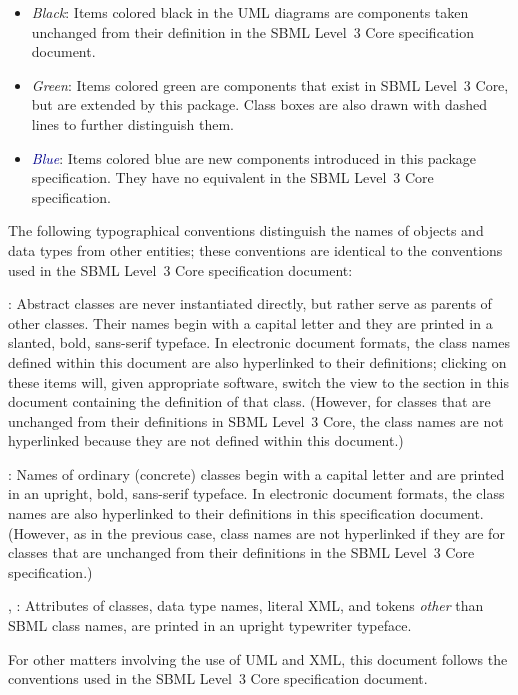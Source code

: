 \begin{itemize}

\item[\raisebox{2.75pt}{\colorbox{black}{\rule{0.8pt}{0.8pt}}}]
  \emph{Black}: Items colored black in the UML diagrams are components
  taken unchanged from their definition in the SBML Level~3 Core
  specification document.

\item[\raisebox{2.75pt}{\colorbox{mediumgreen}{\rule{0.8pt}{0.8pt}}}]
  \emph{\textcolor{mediumgreen}{Green}}: Items colored green are
  components that exist in SBML Level~3 Core, but are extended by this
  package.  Class boxes are also drawn with dashed lines to further
  distinguish them.

\item[\raisebox{2.75pt}{\colorbox{darkblue}{\rule{0.8pt}{0.8pt}}}]
  \emph{\textcolor{darkblue}{Blue}}: Items colored blue are new
  components introduced in this package specification.  They have no
  equivalent in the SBML Level~3 Core specification.

\end{itemize}

The following typographical conventions distinguish the names of objects and data types from other entities; these conventions are identical to the conventions used in the SBML Level~3 Core specification document:

\begin{description}
  
\item {}: Abstract classes are never instantiated directly, but rather serve as parents of other classes.  Their names begin with a capital letter and they are printed in a slanted, bold, sans-serif typeface.  In electronic document formats, the class names defined within this document are also hyperlinked to their definitions; clicking on these items will, given appropriate software, switch the view to the section in this document containing the definition of that class.  (However, for classes that are unchanged from their definitions in SBML Level~3 Core, the class names are not hyperlinked because they are not defined within this document.)
  
\item {}: Names of ordinary (concrete) classes begin with a capital letter and are printed in an upright, bold, sans-serif typeface.  In electronic document formats, the class names are also hyperlinked to their definitions in this specification document.  (However, as in the previous case, class names are not hyperlinked if they are for classes that are unchanged from their definitions in the SBML Level~3 Core specification.)

\item {}, : Attributes of classes, data type names, literal XML, and tokens \emph{other} than SBML class names, are printed in an upright typewriter typeface.

\end{description}

For other matters involving the use of UML and XML, this document follows the conventions used in the SBML Level~3 Core specification document.
